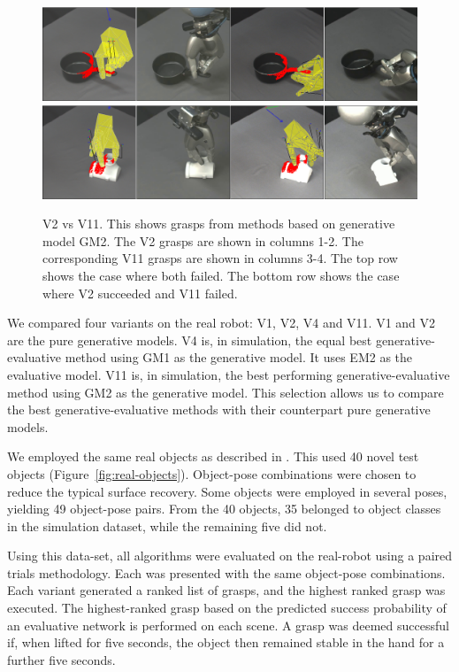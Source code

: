 \begin{figure}[t]
\begin{center}
\includegraphics[width=0.5\columnwidth]{plots/A6fA10f_vertical.png}\\
\includegraphics[width=0.5\columnwidth]{plots/A6sA10f_vertical.png}
\caption{V2 vs V11. This shows grasps from methods based on generative model GM2. The V2 grasps are shown in columns 1-2. The corresponding V11 grasps are shown in columns 3-4. The top row shows the case where both failed. The bottom row shows the case where V2 succeeded and V11 failed. \label{fig:v2fsv11f}}
\end{center}
\end{figure}


We compared four variants on the real robot: V1, V2, V4 and V11. V1 and V2 are the pure generative models. V4 is, in simulation, the equal best generative-evaluative method using GM1 as the generative model. It uses EM2 as the evaluative model. V11 is, in simulation, the best performing generative-evaluative method using GM2 as the generative model. This selection allows us to compare the best generative-evaluative methods with their counterpart pure generative models. 

We employed the same real objects as described in \cite{kopicki2019ijrr}. This used 40 novel test objects (Figure~\ref{fig:real-objects}). Object-pose combinations were chosen to reduce the typical surface recovery. Some objects were employed in several poses, yielding 49 object-pose pairs. From the 40 objects, 35 belonged to object classes in the simulation dataset, while the remaining five did not. 

Using this data-set, all algorithms were evaluated on the real-robot using a paired trials methodology. Each was presented with the same object-pose combinations. Each variant generated a ranked list of grasps, and the highest ranked grasp was executed. The highest-ranked grasp based on the predicted success probability of an evaluative network is performed on each scene. A grasp was deemed successful if, when lifted for five seconds, the object then remained stable in the hand for a further five seconds. 

